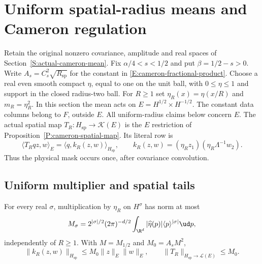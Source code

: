 \section{Uniform spatial-radius means and Cameron regulation}
\label{S:uniform-mean-regulation}

Retain the original nonzero covariance, amplitude and real spaces of
Section~\ref{S:actual-cameron-mean}. Fix
$\alpha/4<s<1/2$ and put $\beta=1/2-s>0$.
Write $A_s=C_s^2\sqrt{R_{\mathrm{sp}}}$ for the constant in
\eqref{E:cameron-fractional-product}.
Choose a real even smooth compact $\eta$, equal to one on the unit ball,
with $0\le\eta\le1$ and support in the closed radius-two ball.
For $R\ge1$ set $\eta_R(x)=\eta(x/R)$ and $m_R=\eta_R^2$.
In this section the mean acts on $E=H^{1/2}\times H^{-1/2}$.
The constant data columns belong to $F$, outside $E$.
All uniform-radius claims below concern $E$.
The actual spatial map $T_R:H_{\mathrm{sp}}\to\mathcal K(E)$
is the $E$ restriction of Proposition~\ref{P:cameron-spatial-map}.
Its literal row is
\begin{equation}\label{E:uniform-mean-row}
  \langle T_Rqz,w\rangle_E
  =\langle q,k_R(z,w)\rangle_{H_{\mathrm{sp}}},
  \qquad
  k_R(z,w)=(\eta_Rz_1)(\eta_R\Lambda^{-1}w_2).
\end{equation}
Thus the physical mask occurs once, after covariance convolution.

\subsection{Uniform multiplier and spatial tails}

\begin{lemma}
  \label{L:uniform-mean-cutoff}
  For every real $\sigma$, multiplication by $\eta_R$ on $H^\sigma$
  has norm at most
  \[
    M_\sigma=2^{|\sigma|/2}(2\pi)^{-d/2}
    \int_{\R^d}|\widehat\eta(p)|\langle p\rangle^{|\sigma|}\ud p,
  \]
  independently of $R\ge1$. With $M=M_{1/2}$ and $M_0=A_sM^2$,
  \begin{equation}\label{E:uniform-spatial-mean}
    \|k_R(z,w)\|_{H_{\mathrm{sp}}}
    \le M_0\|z\|_E\|w\|_E,\qquad
    \|T_R\|_{H_{\mathrm{sp}}\to\mathcal L(E)}\le M_0 .
  \end{equation}
\end{lemma}

